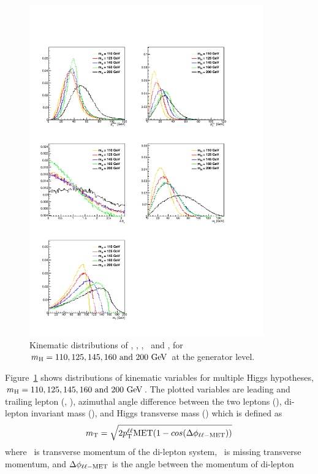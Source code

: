 \begin{figure}[htp]
\centering
\includegraphics[width=0.9\textwidth]{figures/hww_gen_all.pdf}
\caption{Kinematic distributions of \ptlmax, \ptlmin, \delphill, \mll\ and \mT, 
for $m_{\mathrm{H}} = 110, 125, 145, 160\textrm{ and } 200~\mathrm{Ge\kern -0.1em V}$ at the generator level.}
\label{fig:genhww}
\end{figure}
Figure~\ref{fig:genhww} shows distributions of kinematic variables for 
multiple Higgs hypotheses, $m_{\mathrm{H}} = 110, 125, 145, 160\textrm{ and } 200~\mathrm{Ge\kern -0.1em V}$. 
The plotted variables are leading and trailing lepton \pt (\ptlmax, \ptlmin), 
azimuthal angle difference between the two leptons (\delphill), 
di-lepton invariant mass (\mll), and Higgs transverse mass (\mT) which is 
defined as 
\begin{eqnarray} 
m_{\mathrm{T}} = \sqrt{2p_\mathrm{T}^{\ell\ell}\mathrm{MET}(1-cos(\Delta\phi_{\ell\ell-\mathrm{MET}}))}
\end{eqnarray} 
where \ptll\ is transverse momentum of the di-lepton system, 
\met\ is missing transverse momentum, and  
$\Delta\phi_{\ell\ell-\mathrm{MET}}$ is the angle between the momentum of di-lepton

